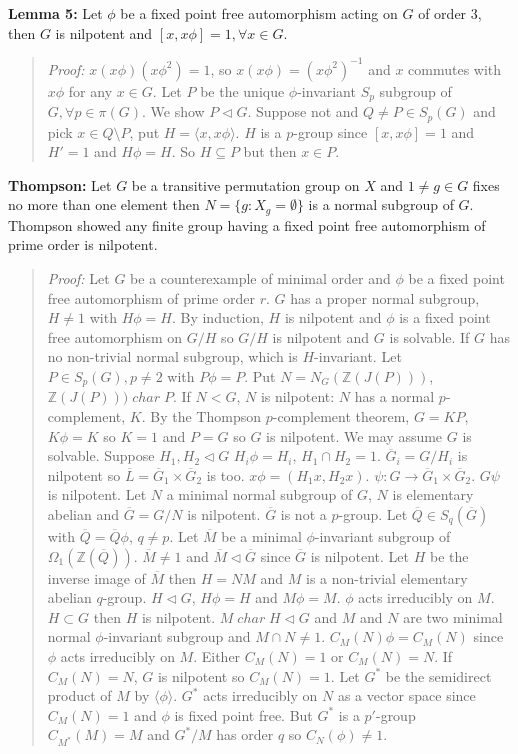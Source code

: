 {\bf Lemma 5:} Let $\phi$ be a fixed point free automorphism acting on $G$ of order $3$, then $G$ is
nilpotent and $[x, x\phi]=1, \forall x \in G$.
\begin{quote}
\emph{Proof:}  
$x(x\phi)(x\phi^2)=1$, so $x(x\phi)= (x\phi^2)^{-1}$ and $x$ commutes
with $x\phi$ for any $x \in G$.
Let $P$ be the unique $\phi$-invariant $S_p$ subgroup of $G, \forall p \in \pi(G)$.  We show
$P \lhd G$.
Suppose not and
$Q \ne P \in S_p(G)$ and pick $x \in Q \setminus P$, put $H=\langle x, x\phi \rangle$.
$H$ is a $p$-group since $[x, x\phi]=1$ and $H'=1$ and $H \phi = H$.  So $H \subseteq P$ but then
$x \in P$.
\end{quote}
{\bf Thompson:}
Let $G$ be a transitive permutation group on $X$ and $1 \ne g \in G$ fixes
no more than one element then $N= \{g: X_g= \emptyset \}$ is a normal subgroup of $G$.
Thompson showed any finite group having a fixed point free automorphism of prime order is nilpotent.
\begin{quote}
\emph{Proof:}  
Let $G$ be a counterexample of minimal order and $\phi$ be a fixed point free automorphism of prime order $r$.
$G$ has a proper normal subgroup, $H \ne 1$ with $H\phi=H$.  By induction, $H$ is nilpotent and $\phi$
is a fixed point free automorphism on $G/H$ so $G/H$ is nilpotent and $G$ is solvable.  If $G$ has no non-trivial
normal subgroup, which is $H$-invariant.  Let $P \in S_p(G), p \ne 2$ with $P\phi=P$.  Put
$N= N_G({\mathbb Z}(J(P)))$, $ {\mathbb Z}(J(P))) \; char \; P$.  If $N < G$, $N$ is nilpotent:
$N$ has a normal $p$-complement, $K$.  By the Thompson $p$-complement theorem, $G=KP$, $K\phi = K$ so
$K = 1$ and $P=G$ so $G$ is nilpotent.  We may assume $G$ is solvable.
Suppose $H_1, H_2 \lhd G$ $H_i\phi = H_i$, $H_1 \cap H_2 = 1$.  ${\overline G_i} = G/H_i$ is nilpotent
so ${\overline L} = {\overline G_1} \times {\overline G_2}$ is too.  $x\phi = (H_1x, H_2x)$.
$\psi: G \rightarrow {\overline G_1} \times {\overline G_2}$.  $G\psi$ is nilpotent.
Let $N$ a minimal normal subgroup of $G$, $N$ is elementary abelian and ${\overline G} = G/N$ is nilpotent.
${\overline G}$ is not a $p$-group.  Let ${\overline Q} \in S_q({\overline G})$ with 
${\overline Q} = {\overline Q} \phi$, $q \ne p$.  Let ${\overline M}$ be a minimal $\phi$-invariant
subgroup of $\Omega_1({\mathbb Z}({\overline Q}))$.  ${\overline M} \ne 1$ and ${\overline M} \lhd {\overline G}$
since ${\overline G}$ is nilpotent.  Let $H$ be the inverse image of ${\overline M}$ then
$H=NM$ and $M$ is a non-trivial elementary abelian $q$-group.  $H \lhd G$, $H\phi = H$ and $M\phi=M$.
$\phi$ acts irreducibly on $M$.  $H \subset G$ then $H$ is nilpotent.
$M \; char \; H \lhd G$ and $M$ and $N$ are two minimal normal $\phi$-invariant subgroup and
$M \cap N \ne 1$.  $C_M(N)\phi = C_M(N)$ since $\phi$ acts irreducibly on $M$.  Either
$C_M(N) = 1$ or $C_M(N) = N$.
If $C_M(N) = N$, $G$ is nilpotent so $C_M(N) = 1$.  Let $G^*$ be the semidirect product of
$M$ by $\langle \phi \rangle$.  $G^*$ acts irreducibly on $N$ as a vector space since
$C_M(N) = 1$ and $\phi$ is fixed point free.  But $G^*$ is a $p'$-group $C_{M^*}(M) = M$ and
$G^*/M$ has order $q$ so $C_N(\phi) \ne 1$.
\end{quote}

